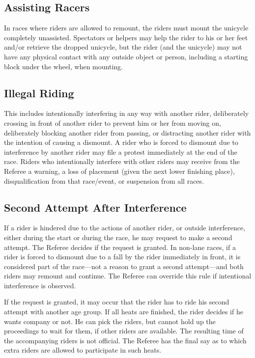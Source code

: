 \subsection{Assisting Racers}

In races where riders are allowed to remount, the riders must mount the unicycle completely unassisted.
Spectators or helpers may help the rider to his or her feet and/or retrieve the dropped unicycle, but the rider (and the unicycle) may not have any physical contact with any outside object or person, including a starting block under the wheel, when mounting.

\subsection{Illegal Riding}

This includes intentionally interfering in any way with another rider, deliberately crossing in front of another rider to prevent him or her from moving on, deliberately blocking another rider from passing, or distracting another rider with the intention of causing a dismount.
A rider who is forced to dismount due to interference by another rider may file a protest immediately at the end of the race.
Riders who intentionally interfere with other riders may receive from the Referee a warning, a loss of placement (given the next lower finishing place), disqualification from that race/event, or suspension from all races.

\subsection{Second Attempt After Interference}
If a rider is hindered due to the actions of another rider, or outside interference, either during the start or during the race, he may request to make a second attempt.
The Referee decides if the request is granted. In non-lane races, if a rider is forced to dismount due to a fall by the rider immediately in front, it is considered part of the race---not a reason to grant a second attempt---and both riders may remount and continue.
The Referee can override this rule if intentional interference is observed.

If the request is granted, it may occur that the rider has to ride his second attempt with another age group.
If all heats are finished, the rider decides if he wants company or not.
He can pick the riders, but cannot hold up the proceedings to wait for them, if other riders are available.
The resulting time of the accompanying riders is not official.
The Referee has the final say as to which extra riders are allowed to participate in such heats.

